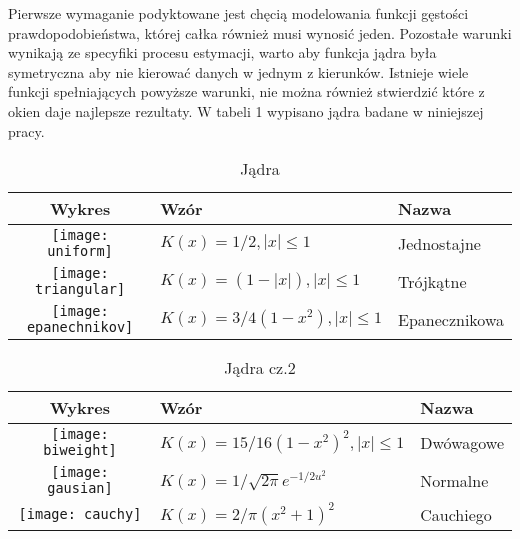 \documentclass[a4paper,12pt,twoside]{article}
\begin{document}
Pierwsze wymaganie podyktowane jest chęcią modelowania funkcji gęstości prawdopodobieństwa, której całka również musi wynosić jeden. Pozostałe warunki wynikają ze specyfiki procesu estymacji, warto aby funkcja jądra była symetryczna aby nie kierować danych w jednym z kierunków.  Istnieje wiele funkcji spełniających powyższe warunki, nie można również stwierdzić które z okien daje najlepsze rezultaty. W tabeli 1 wypisano jądra badane w niniejszej pracy. 
\newpage
\begin{table}[h!]
  \centering
  \caption{Jądra}
  \begin{tabular}{ | c | m{6cm} | m{3cm} | }
    \hline
    Wykres & Wzór & Nazwa \\ \hline
    \begin{minipage}[c][7cm]{.4\textwidth}
      \texttt{[image: uniform]}
    \end{minipage}
    &
     $ K(x)=1/2, |x|\leq1$
    & 
    Jednostajne
    \\ \hline
    \begin{minipage}[c][7cm]{.4\textwidth}
      \texttt{[image: triangular]}
    \end{minipage}
    &
     $ K(x)=(1-|x|), |x|\leq1$
    & 
    Trójkątne
    \\ \hline
    \begin{minipage}[c][7cm]{.4\textwidth}
      \texttt{[image: epanechnikov]}
    \end{minipage}
    &
     $ K(x)=3/4(1-x^2), |x|\leq1$
    & 
    Epanecznikowa
    \\ \hline
    \end{tabular}
  \label{tbl:myLboro}
\end{table}
\begin{table}[h!]
  \centering
  \caption{Jądra cz.2}
  \begin{tabular}{ | c | m{6cm} | m{3cm} | }
    \hline
    Wykres & Wzór & Nazwa \\ \hline
    \begin{minipage}[c][7cm]{.4\textwidth}
      \texttt{[image: biweight]}
    \end{minipage}
    &
    $ K(x)=15/16(1-x^2)^2, |x|\leq1$
    & 
    Dwówagowe
    \\ \hline
    \begin{minipage}[c][7cm]{.4\textwidth}
      \texttt{[image: gausian]}
    \end{minipage}
    &
     $ K(x)=1/\sqrt{2\pi}e^{-1/2u^2} $
    & 
    Normalne
    \\ \hline
    \begin{minipage}[c][7cm]{.4\textwidth}
      \texttt{[image: cauchy]}
    \end{minipage}
    &
     $ K(x)=2/\pi(x^2+1)^2 $
    & 
    Cauchiego
    \\ \hline
    \end{tabular}
  \label{tbl:myLboro}
\end{table}
\clearpage
\end{document}
